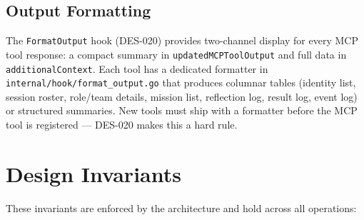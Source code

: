 \documentclass[a4paper,10pt]{article}
\newcommand{\fpath}[1]{\texttt{#1}}
\begin{document}
\subsection{Output Formatting}

The \texttt{FormatOutput} hook (DES-020) provides two-channel
display for every MCP tool response: a compact summary in
\texttt{updatedMCPToolOutput} and full data in
\texttt{additionalContext}.  Each tool has a dedicated formatter
in \fpath{internal/hook/format\_output.go} that produces columnar
tables (identity list, session roster, role/team details, mission
list, reflection log, result log, event log) or structured
summaries.  New tools must ship with a formatter before the MCP
tool is registered --- DES-020 makes this a hard rule.

\section{Design Invariants}

These invariants are enforced by the architecture and hold across
all operations:
\end{document}
